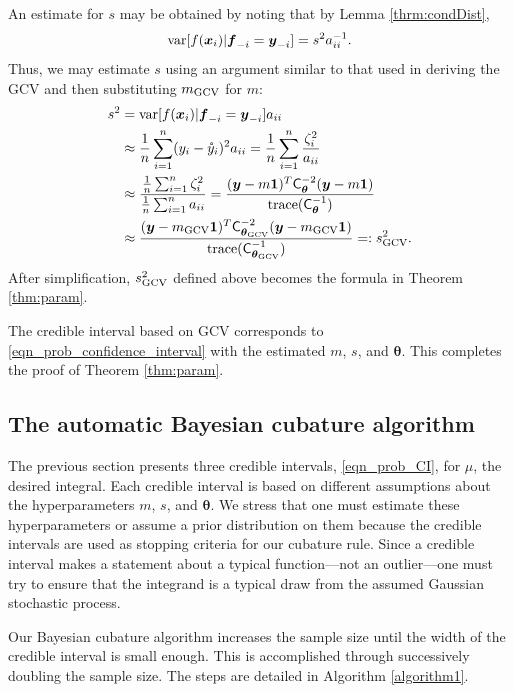 \documentclass{svjour3}                     %
\newcommand{\bm}[1]{\boldsymbol{#1}}
\newcommand{\trace}[1]{\textup{trace}{#1}}
\newcommand{\vtheta}{{\bm{\theta}}}
\newcommand{\vf}{\bm{f}}
\newcommand{\vx}{\bm{x}}
\newcommand{\vy}{\bm{y}}
\newcommand{\vone}{\bm{1}}
\newcommand{\mC}{\mathsf{C}}
\newcommand{\var}{{\textup{var}}}
\newcommand{\GCV}{\textup{GCV}}
\begin{document}
An estimate for $s$ may be obtained by noting that by Lemma \ref{thrm:condDist},
\begin{align*}
\var[f(\vx_i ) | \vf_{-i} = \vy_{-i}] = s^2 a_{ii}^{-1}.
\end{align*}
Thus, we may estimate $s$ using an argument similar to that used in deriving the GCV and then substituting $m_{\textup{GCV}}$ for $m$:
\begin{align*}
s^2 &= \var[f(\vx_i ) | \vf_{-i} = \vy_{-i}] a_{ii} \\ 
& \approx \frac 1n \sum_{i=1}^n (y_i - \mathring{y}_i)^2a_{ii}
 = \frac 1n \sum_{i=1}^n \frac{\zeta_i^2}{a_{ii}} \\ 
 & \approx \frac{ \frac 1n \sum_{i=1}^n \zeta_i^2}{\frac 1n \sum_{i=1}^n a_{ii} } = \frac{(\vy - m\vone)^T \mC_\vtheta^{-2} (\vy - m \vone)}{ \trace(\mC_\vtheta^{-1}) } \\ 
 & \approx  \frac{(\vy - m_\GCV\vone)^T \mC_{\vtheta_\GCV}^{-2} (\vy - m_\GCV \vone)}{ \trace(\mC_{\vtheta_\GCV}^{-1}) } =: s^2_{\textup{GCV}}.
\end{align*}
After simplification, $s^2_{\textup{GCV}}$ defined above becomes the formula in Theorem \ref{thm:param}.

The credible interval based on GCV corresponds to \eqref{eqn_prob_confidence_interval} with the estimated $m$, $s$, and $\vtheta$.  This completes the proof of Theorem \ref{thm:param}.


\subsection{The automatic Bayesian cubature algorithm}
\label{sec:bayes_cubature_algo}
The previous section presents three credible intervals, \eqref{eqn_prob_CI}, for $\mu$, the desired integral.  Each credible interval is based on different assumptions about the hyperparameters $m$, $s$, and $\vtheta$.  We stress that one must estimate these hyperparameters or assume a prior distribution on them because the credible intervals are used as stopping criteria for our cubature rule.  Since a credible interval makes a statement about a typical function---not an outlier---one must try to ensure that the integrand is a typical draw from the assumed Gaussian stochastic process.

Our  Bayesian cubature algorithm increases the sample size until the width of the credible interval is small enough.  This is accomplished through successively doubling the sample size.  The steps are detailed in Algorithm \ref{algorithm1}.
\end{document}
